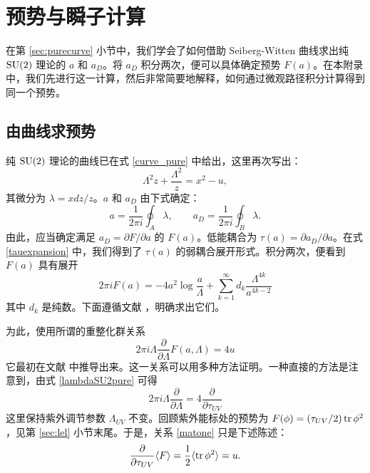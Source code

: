 \section{预势与瞬子计算}\label{sec:instcount}
在第 \ref{sec:purecurve} 小节中，我们学会了如何借助 Seiberg-Witten 曲线求出纯 $\mathop{\mathrm{SU}}(2)$ 理论的 $a$ 和 $a_D$。将 $a_D$ 积分两次，便可以具体确定预势 $F(a)$。在本附录中，我们先进行这一计算，然后非常简要地解释，如何通过微观路径积分计算得到同一个预势。

\subsection{由曲线求预势}
纯 $\mathop{\mathrm{SU}}(2)$ 理论的曲线已在式 \eqref{curve_pure} 中给出，这里再次写出：
\begin{equation}
\Lambda^2 z+\frac{\Lambda^2}z=x^2-u,
\end{equation}
其微分为 $\lambda=xdz/z$。$a$ 和 $a_D$ 由下式确定：
\begin{equation}
a=\frac{1}{2\pi i}\oint_A\lambda,\qquad
a_D=\frac{1}{2\pi i}\oint_B\lambda.\label{aad}
\end{equation}
由此，应当确定满足 $a_D=\partial F/\partial a$ 的 $F(a)$。低能耦合为 $\tau(a)=\partial a_D/\partial a$。在式 \eqref{tauexpansion} 中，我们得到了 $\tau(a)$ 的弱耦合展开形式。积分两次，便看到 $F(a)$ 具有展开
\begin{equation}
2\pi iF(a)=-4a^2\log\frac{a}{\Lambda}+\sum_{k=1}^\infty d_k\frac{\Lambda^{4k}}{a^{4k-2}}\label{Fweak}
\end{equation}
其中 $d_k$ 是纯数。下面遵循文献 \cite{Chan:1999gj}，明确求出它们。

为此，使用所谓的重整化群关系
\begin{equation}
2\pi i\Lambda\frac{\partial}{\partial\Lambda}F(a,\Lambda)=4u\label{matone}
\end{equation}
它最初在文献 \cite{Matone:1995rx} 中推导出来。这一关系可以用多种方法证明。一种直接的方法是注意到，由式 \eqref{lambdaSU2pure} 可得
\begin{equation}
2\pi i\Lambda\frac{\partial}{\partial\Lambda}=4\frac{\partial}{\partial\tau_{UV}}
\end{equation}
这里保持紫外调节参数 $\Lambda_{UV}$ 不变。回顾紫外能标处的预势为 $F(\phi)=(\tau_{UV}/2)\mathop{\mathrm{tr}}\nolimits\phi^2$，见第 \ref{sec:lel} 小节末尾。于是，关系 \eqref{matone} 只是下述陈述：
\begin{equation}
\frac{\partial}{\partial\tau_{UV}}\langle F\rangle=\frac12\langle\mathop{\mathrm{tr}}\nolimits\phi^2\rangle=u.
\end{equation}

